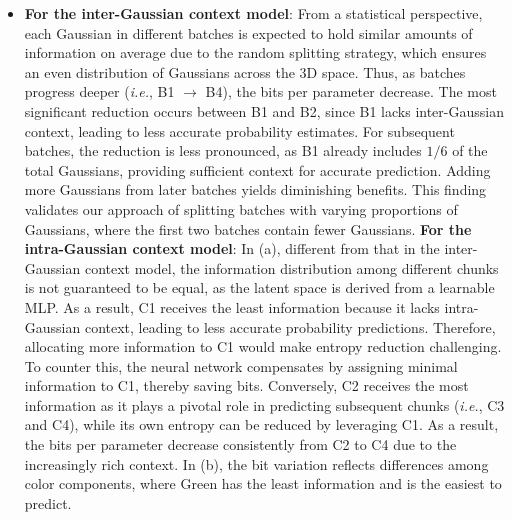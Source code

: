 \documentclass{article} %
\newcommand{\ie}{\textit{i.e.}}
\begin{document}
\begin{itemize}
    \item \textbf{For the inter-Gaussian context model}: From a statistical perspective, each Gaussian in different batches is expected to hold similar amounts of information on average due to the random splitting strategy, which ensures an even distribution of Gaussians across the 3D space. Thus, as batches progress deeper (\ie, B1 $\rightarrow$ B4), the bits per parameter decrease. The most significant reduction occurs between B1 and B2, since B1 lacks inter-Gaussian context, leading to less accurate probability estimates. For subsequent batches, the reduction is less pronounced, as B1 already includes $1/6$ of the total Gaussians, providing sufficient context for accurate prediction. Adding more Gaussians from later batches yields diminishing benefits. This finding validates our approach of splitting batches with varying proportions of Gaussians, where the first two batches contain fewer Gaussians.
    \textbf{For the intra-Gaussian context model}: In (a), different from that in the inter-Gaussian context model, the information distribution among different chunks is not guaranteed to be equal, as the latent space is derived from a learnable MLP. As a result, C1 receives the least information because it lacks intra-Gaussian context, leading to less accurate probability predictions. Therefore, allocating more information to C1 would make entropy reduction challenging. To counter this, the neural network compensates by assigning minimal information to C1, thereby saving bits. Conversely, C2 receives the most information as it plays a pivotal role in predicting subsequent chunks (\ie, C3 and C4), while its own entropy can be reduced by leveraging C1. As a result, the bits per parameter decrease consistently from C2 to C4 due to the increasingly rich context. In (b), the bit variation reflects differences among color components, where Green has the least information and is the easiest to predict.
\end{itemize}
\end{document}
